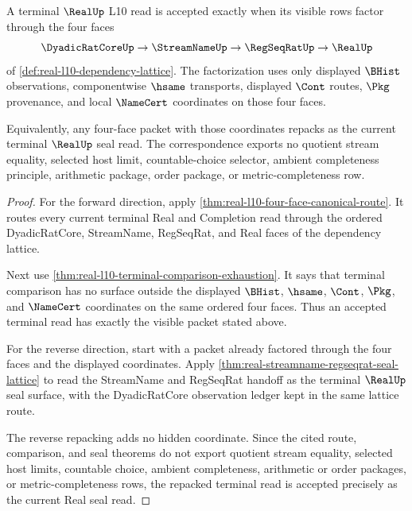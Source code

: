 \begin{theorem}
\label{thm:real-l10-terminal-four-face-correspondence}
A terminal $\RealUp$ L10 read is accepted exactly when its visible rows factor through the four faces
$$
\DyadicRatCoreUp \to \StreamNameUp \to \RegSeqRatUp \to \RealUp
$$
of \autoref{def:real-l10-dependency-lattice}. The factorization uses only displayed $\BHist$ observations, componentwise $\hsame$ transports, displayed $\Cont$ routes, $\Pkg$ provenance, and local $\NameCert$ coordinates on those four faces.

Equivalently, any four-face packet with those coordinates repacks as the current terminal $\RealUp$ seal read. The correspondence exports no quotient stream equality, selected host limit, countable-choice selector, ambient completeness principle, arithmetic package, order package, or metric-completeness row.
\end{theorem}
\begin{proof}
For the forward direction, apply \autoref{thm:real-l10-four-face-canonical-route}. It routes every current terminal Real and Completion read through the ordered DyadicRatCore, StreamName, RegSeqRat, and Real faces of the dependency lattice.

Next use \autoref{thm:real-l10-terminal-comparison-exhaustion}. It says that terminal comparison has no surface outside the displayed $\BHist$, $\hsame$, $\Cont$, $\Pkg$, and $\NameCert$ coordinates on the same ordered four faces. Thus an accepted terminal read has exactly the visible packet stated above.

For the reverse direction, start with a packet already factored through the four faces and the displayed coordinates. Apply \autoref{thm:real-streamname-regseqrat-seal-lattice} to read the StreamName and RegSeqRat handoff as the terminal $\RealUp$ seal surface, with the DyadicRatCore observation ledger kept in the same lattice route.

The reverse repacking adds no hidden coordinate. Since the cited route, comparison, and seal theorems do not export quotient stream equality, selected host limits, countable choice, ambient completeness, arithmetic or order packages, or metric-completeness rows, the repacked terminal read is accepted precisely as the current Real seal read.
\end{proof}

